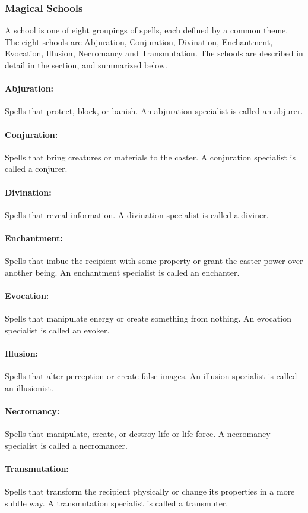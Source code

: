 \subsubsection{Magical Schools}
A school is one of eight groupings of spells, each defined by a common theme. 
The eight schools are Abjuration, Conjuration, Divination, Enchantment, Evocation, Illusion, Necromancy and Transmutation. 
The schools are described in detail in the  section, and summarized below.

\paragraph{Abjuration:} 
Spells that protect, block, or banish. An abjuration specialist is called an abjurer.
\paragraph{Conjuration:}
Spells that bring creatures or materials to the caster. A conjuration specialist is called a conjurer.
\paragraph{Divination:}
Spells that reveal information. A divination specialist is called a diviner.
\paragraph{Enchantment:} 
Spells that imbue the recipient with some property or grant the caster power over another being. An enchantment specialist is called an enchanter.
\paragraph{Evocation:}
Spells that manipulate energy or create something from nothing. An evocation specialist is called an evoker.
\paragraph{Illusion:}
Spells that alter perception or create false images. An illusion specialist is called an illusionist.
\paragraph{Necromancy:} 
Spells that manipulate, create, or destroy life or life force. A necromancy specialist is called a necromancer.
\paragraph{Transmutation:}
Spells that transform the recipient physically or change its properties in a more subtle way. A transmutation specialist is called a transmuter.